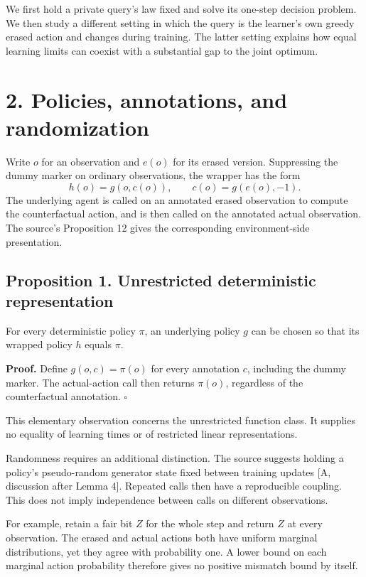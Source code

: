 \documentclass[
  11pt,
  letterpaper,
]{article}
\begin{document}
We first hold a private query's law fixed and solve its one-step
decision problem. We then study a different setting in which the query
is the learner's own greedy erased action and changes during training.
The latter setting explains how equal learning limits can coexist with a
substantial gap to the joint optimum.

\section{2. Policies, annotations, and
randomization}\label{policies-annotations-and-randomization}

Write \(o\) for an observation and \(e(o)\) for its erased version.
Suppressing the dummy marker on ordinary observations, the wrapper has
the form \[
             h(o)=g(o,c(o)),\qquad c(o)=g(e(o),-1).
\] The underlying agent is called on an annotated erased observation to
compute the counterfactual action, and is then called on the annotated
actual observation. The source's Proposition 12 gives the corresponding
environment-side presentation.

\subsection{Proposition 1. Unrestricted deterministic
representation}\label{proposition-1.-unrestricted-deterministic-representation}

For every deterministic policy \(\pi\), an underlying policy \(g\) can
be chosen so that its wrapped policy \(h\) equals \(\pi\).

\textbf{Proof.} Define \(g(o,c)=\pi(o)\) for every annotation \(c\),
including the dummy marker. The actual-action call then returns
\(\pi(o)\), regardless of the counterfactual annotation.
\hfill\(\square\)

This elementary observation concerns the unrestricted function class. It
supplies no equality of learning times or of restricted linear
representations.

Randomness requires an additional distinction. The source suggests
holding a policy's pseudo-random generator state fixed between training
updates {[}A, discussion after Lemma 4{]}. Repeated calls then have a
reproducible coupling. This does not imply independence between calls on
different observations.

For example, retain a fair bit \(Z\) for the whole step and return \(Z\)
at every observation. The erased and actual actions both have uniform
marginal distributions, yet they agree with probability one. A lower
bound on each marginal action probability therefore gives no positive
mismatch bound by itself.
\end{document}
